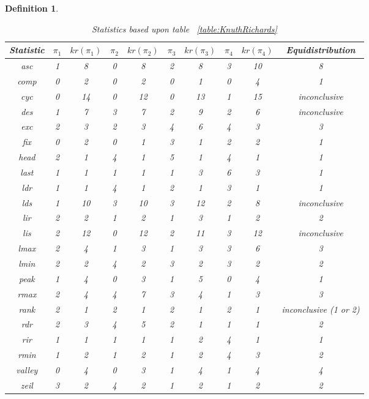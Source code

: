 \documentclass[12pt]{article}
\newtheorem{definition}{Definition}
\begin{document}
\begin{definition}
\begin{table}[H]
\caption{Statistics based upon table ~\ref{table:KnuthRichards}}
\centering
\begin{tabular}{c | c c c c c c c c | c}
\hline\hline
Statistic & $\pi_1$ & $kr(\pi_1)$ & $\pi_2$ & $kr(\pi_2)$ & $\pi_3$ & $kr(\pi_3)$ & $\pi_4$ & $kr(\pi_4)$ & Equidistribution\\ [0.5ex]
\hline
asc & 1 & 8 & 0 & 8 & 2 & 8 & 3 & 10 & 8\\ 
comp & 0 & 2 & 0 & 2 & 0 & 1 & 0 & 4 & 1\\
cyc & 0 & 14 & 0 & 12 & 0 & 13 & 1 & 15 & inconclusive\\
des & 1 & 7 & 3 & 7 & 2 & 9 & 2 & 6 & inconclusive\\
exc & 2 & 3 & 2 & 3 & 4 & 6 & 4 & 3 & 3\\
fix & 0 & 2 & 0 & 1 & 3 & 1 & 2 & 2 & 1\\
head & 2 & 1 & 4 & 1 & 5 & 1 & 4 & 1 & 1\\
last & 1 & 1 & 1 & 1 & 1 & 3 & 6 & 3 & 1\\ 
ldr & 1 & 1 & 4 & 1 & 2 & 1 & 3 & 1 & 1\\
lds & 1 & 10 & 3 & 10 & 3 & 12 & 2 & 8 & inconclusive\\
lir & 2 & 2 & 1 & 2 & 1 & 3 & 1 & 2 & 2\\
lis & 2 & 12 & 0 & 12 & 2 & 11 & 3 & 12 & inconclusive\\
lmax & 2 & 4 & 1 & 3 & 1 & 3 & 3 & 6 & 3\\
lmin & 2 & 2 & 4 & 2 & 3 & 2 & 3 & 2 & 2\\
peak & 1 & 4 & 0 & 3 & 1 & 5 & 0 & 4 & 1\\
rmax & 2 & 4 & 4 & 7 & 3 & 4 & 1 & 3 & 3\\
rank & 2 & 1 & 2 & 1 & 2 & 1 & 2 & 1 & inconclusive (1 or 2)\\
rdr & 2 & 3 & 4 & 5 & 2 & 1 & 1 & 1 & 2\\
rir & 1 & 1 & 1 & 1 & 1 & 2 & 4 & 1 & 1\\
rmin & 1 & 2 & 1 & 2 & 1 & 2 & 4 & 3 & 2\\
valley & 0 & 4 & 0 & 3 & 1 & 4 & 1 & 4 & 4\\
zeil & 3 & 2 & 4 & 2 & 1 & 2 & 1 & 2 & 2\\
\hline
\end{tabular}
\label{table:KnuthRichardsPerms}
\end{table}


\end{definition}
\end{document}
